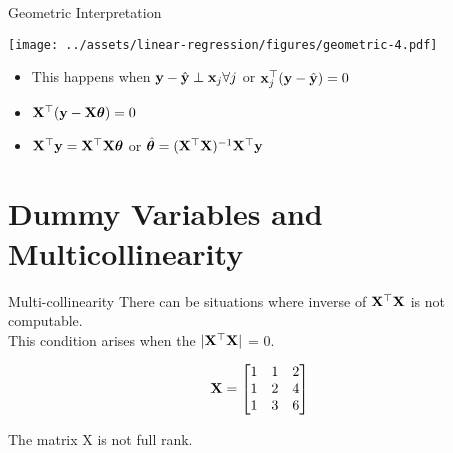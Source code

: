 \documentclass{beamer}
\begin{document}
\begin{frame}{Geometric Interpretation}	

    \texttt{[image: ../assets/linear-regression/figures/geometric-4.pdf]}

    


\begin{itemize}[<+->]
\item This happens when $\mathbf{y}-\hat{\mathbf{y}}\perp \mathbf{x}_j \forall j$ or $\mathbf{x}_j^\top(\mathbf{y}-\hat{\mathbf{y}})=0$
\item $\mathbf{X}^\top(\mathbf{y}-\mathbf{X}\boldsymbol{\theta})=0$
\item $\mathbf{X}^\top\mathbf{y} = \mathbf{X}^\top\mathbf{X}\boldsymbol{\theta}$ or $\hat{\boldsymbol{\theta}} =(\mathbf{X}^\top\mathbf{X})^{-1}\mathbf{X}^\top\mathbf{y}$ 
\end{itemize}

\end{frame}




\section{Dummy Variables and Multicollinearity}
\begin{frame}{Multi-collinearity}
    There can be situations where inverse of $\mathbf{X}^\top\mathbf{X}$ is not computable. \\
    \pause This condition arises when the $|\mathbf{X}^\top\mathbf{X}|$ = 0.
    
    \begin{equation}
    \mathbf{X} = \begin{bmatrix}
    1 & 1& 2\\
    1 & 2& 4\\
    1 & 3& 6\\
    \end{bmatrix}
    \end{equation}
    
    \pause The matrix X is not full rank. 
    \end{frame}
    
    
    
    
    
\end{document}
